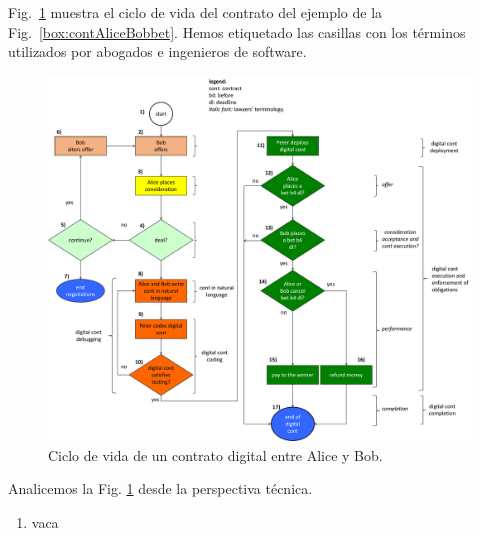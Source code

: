 \documentclass[12pt]{report} %
\begin{document}
 Fig.~\ref{fig:lifecycledigicont} muestra el ciclo de vida del contrato del ejemplo de la Fig.~\ref{box:contAliceBobbet}. Hemos etiquetado las casillas con los términos utilizados por abogados e ingenieros de software.
 
 
\begin{figure}
\centering
 \includegraphics[width=1.0\columnwidth]{figures/lifecycledigicont.pdf}
\caption{Ciclo de vida de un contrato digital entre Alice y Bob.}  
\label{fig:lifecycledigicont}
\end{figure}
    

Analicemos la Fig. \ref{fig:lifecycledigicont} desde la perspectiva técnica.

   
    
\begin{enumerate}
    \item  vaca
\end{enumerate}
     
 
\end{document}
